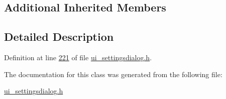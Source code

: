 \subsection*{Additional Inherited Members}


\subsection{Detailed Description}


Definition at line \hyperlink{a00141_source_l00221}{221} of file \hyperlink{a00141_source}{ui\+\_\+settingsdialog.\+h}.



The documentation for this class was generated from the following file\+:\begin{DoxyCompactItemize}
\item 
\hyperlink{a00141}{ui\+\_\+settingsdialog.\+h}\end{DoxyCompactItemize}
